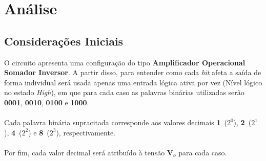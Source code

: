 \documentclass[12pt,openany,oneside,a4paper]{abntex2}
\begin{document}
\imprimircapa
\imprimirfolhaderosto*

\tableofcontents

\chapter{Análise}
\section{Considerações Iniciais}
    O circuito apresenta uma configuração do tipo \textbf{Amplificador Operacional Somador Inversor}. A partir disso, para entender como cada \textit{bit} afeta a saída de forma individual será usada apenas uma entrada lógica ativa por vez (Nível lógico no estado \textit{High}), em que para cada caso as palavras binárias utilizadas serão \textbf{0001}, \textbf{0010}, \textbf{0100} e \textbf{1000}. 
    \\ \\
    Cada palavra binária supracitada corresponde aos valores decimais \textbf{1}~($2^0$), \textbf{2}~($2^1$), \textbf{4}~($2^2$) e \textbf{8}~($2^3$), respectivamente.
    \\ \\
    Por fim, cada valor decimal será atribuído à tensão $\mathbf{V}_{o}$ para cada caso.
\end{document}

